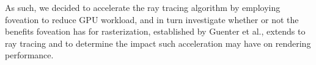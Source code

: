 As such, we decided to accelerate the ray tracing algorithm by employing foveation to reduce GPU workload, and in turn investigate whether or not the benefits foveation has for rasterization, established by Guenter et al., extends to ray tracing and to determine the impact such acceleration may have on rendering performance.


